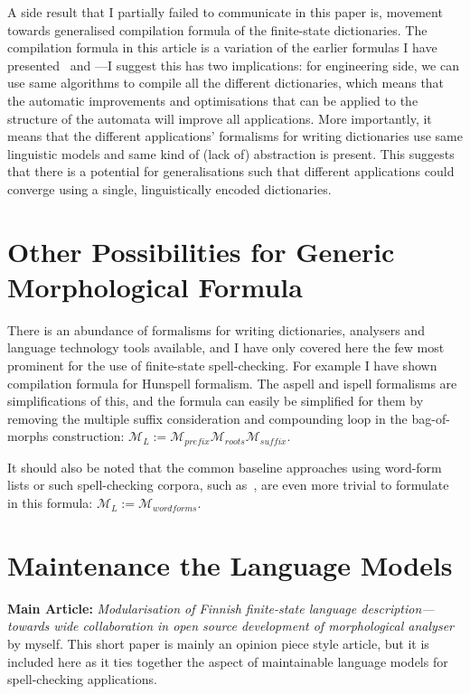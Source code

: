 \documentclass[officiallayout]{unihelcompling}
\begin{document}
A side result that I partially failed to communicate in this paper is, movement
towards generalised compilation formula of the finite-state dictionaries. The
compilation formula in this article is a variation of the earlier formulas I
have presented~\citep{linden2009hfst} and ---I
suggest this has two implications: for engineering side, we can use same
algorithms to compile all the different dictionaries, which means that the
automatic improvements and optimisations that can be applied to the structure
of the automata will improve all applications. More importantly, it means that
the different applications' formalisms for writing dictionaries use same
linguistic models and same kind of (lack of) abstraction is present. This
suggests that there is a potential for generalisations such that different
applications could converge using a single, linguistically encoded
dictionaries.

\section{Other Possibilities for Generic Morphological Formula}
\label{sec:other-lms}

There is an abundance of formalisms for writing dictionaries, analysers and
language technology tools available, and I have only covered here the few most
prominent for the use of finite-state spell-checking. For example I have shown
compilation formula for Hunspell formalism. The aspell and ispell formalisms
are simplifications of this, and the formula can easily be simplified for them
by removing the multiple suffix consideration and compounding loop in the
bag-of-morphs construction: $\mathcal{M}_L := \mathcal{M}_{prefix}
\mathcal{M}_{roots} \mathcal{M}_{suffix}$.

It should also be noted that the common baseline approaches using word-form
lists or such spell-checking corpora, such as~\citet{norvig2010howto}, are even
more trivial to formulate in this formula: $\mathcal{M}_L :=
\mathcal{M}_{wordforms}$.

\section{Maintenance the Language Models}
\label{sec:maintenance}

\textbf{Main Article:} \emph{Modularisation of Finnish finite-state language 
description—towards wide collaboration in open source development of
morphological analyser} by myself. This short paper is mainly an opinion
piece style article, but it is included here as it ties together the
aspect of maintainable language models for spell-checking applications.
\end{document}
